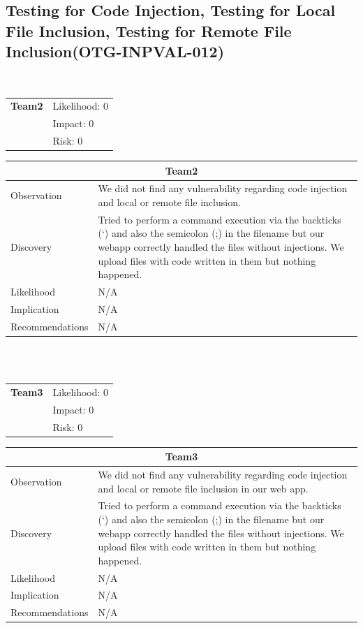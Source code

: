 \documentclass[headsepline,footsepline,footinclude=false,oneside,fontsize=11pt,paper=a4,listof=totoc,bibliography=totoc]{scrbook} %
\begin{document}
 
\pagebreak
\subsection{Testing for Code Injection, Testing for Local File Inclusion, Testing for Remote File Inclusion(OTG-INPVAL-012)}\

\begin{tabular}{cR{12cm}}
	\textbf{Team2} & Likelihood: 0\\& Impact: 0\\& Risk: 0
\end{tabular}

\begin{tabular}{ l|p{11cm}  }
	\hline
	\multicolumn{2}{c}{\textbf{Team2}} \\
	\hline
	Observation   & We did not find any vulnerability regarding code injection and local or remote file inclusion.  \\
	Discovery  & Tried to perform a command execution via the backticks (`) and also the semicolon (;) in the filename but our	webapp correctly handled the files without injections. We upload files with code written in them but nothing happened. \\
	Likelihood & N/A \\
	Implication    & N/A \\
	Recommendations & N/A \\ 
	\hline
\end{tabular}
\\
\vspace{0.5cm}
\\
\begin{tabular}{cR{12cm}}
	\textbf{Team3} & Likelihood: 0\\& Impact: 0\\& Risk: 0
\end{tabular}

\begin{tabular}{ l|p{11cm}  }
	\hline
	\multicolumn{2}{c}{\textbf{Team3}} \\
	\hline
	Observation   & We did not find any vulnerability regarding code injection and local or remote file inclusion in our web app.   \\
	Discovery  & Tried to perform a command execution via the backticks (`) and also the semicolon (;) in the filename but our	webapp correctly handled the files without injections. We upload files with code written in them but nothing happened. \\
	Likelihood & N/A \\
	Implication    & N/A \\
	Recommendations & N/A \\ 
	\hline
\end{tabular}
\pagebreak
\end{document}
